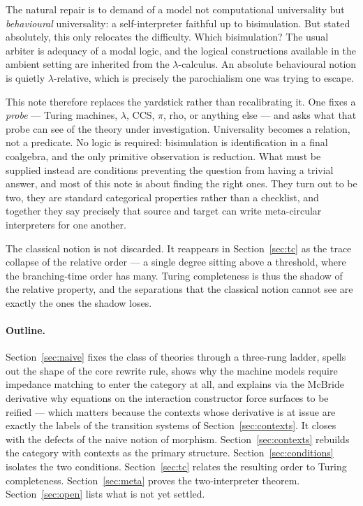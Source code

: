 \documentclass[11pt,a4paper]{article}
\theoremstyle{definition}
\theoremstyle{plain}
\theoremstyle{remark}
\begin{document}
The natural repair is to demand of a model not computational universality but
\emph{behavioural} universality: a self-interpreter faithful up to bisimulation. But
stated absolutely, this only relocates the difficulty. Which bisimulation? The usual
arbiter is adequacy of a modal logic, and the logical constructions available in the
ambient setting are inherited from the $\lambda$-calculus. An absolute behavioural
notion is quietly $\lambda$-relative, which is precisely the parochialism one was
trying to escape.

This note therefore replaces the yardstick rather than recalibrating it. One fixes a
\emph{probe} --- Turing machines, $\lambda$, CCS, $\pi$, rho, or anything else --- and
asks what that probe can see of the theory under investigation. Universality becomes
a relation, not a predicate. No logic is required: bisimulation is identification in
a final coalgebra, and the only primitive observation is reduction. What must be
supplied instead are conditions preventing the question from having a trivial answer,
and most of this note is about finding the right ones. They turn out to be two, they
are standard categorical properties rather than a checklist, and together they say
precisely that source and target can write meta-circular interpreters for one
another.

The classical notion is not discarded. It reappears in Section~\ref{sec:tc} as the
trace collapse of the relative order --- a single degree sitting above a threshold,
where the branching-time order has many. Turing completeness is thus the shadow of
the relative property, and the separations that the classical notion cannot see are
exactly the ones the shadow loses.

\paragraph{Outline.}
Section~\ref{sec:naive} fixes the class of theories through a three-rung ladder,
spells out the shape of the core rewrite rule, shows why the machine models require
impedance matching to enter the category at all, and explains via the McBride derivative
why equations on the interaction constructor force surfaces to be reified --- which
matters because the contexts whose derivative is at issue are exactly the labels of
the transition systems of Section~\ref{sec:contexts}. It closes with the defects of
the naive notion of morphism.
Section~\ref{sec:contexts} rebuilds the category with contexts as the primary
structure. Section~\ref{sec:conditions} isolates the two conditions.
Section~\ref{sec:tc} relates the resulting order to Turing completeness.
Section~\ref{sec:meta} proves the two-interpreter theorem. Section~\ref{sec:open}
lists what is not yet settled.
\end{document}
